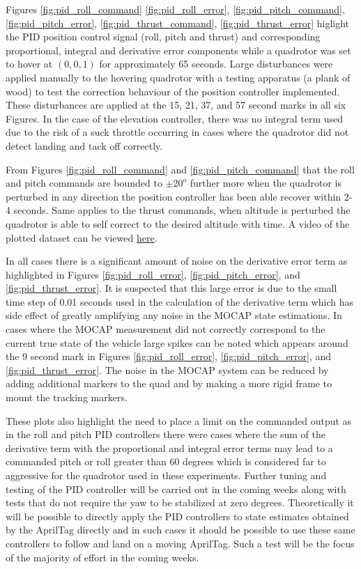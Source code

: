 \documentclass[11pt, twocolumn]{article}
\begin{document}
Figures \ref{fig:pid_roll_command} \ref{fig:pid_roll_error},	\ref{fig:pid_pitch_command}, \ref{fig:pid_pitch_error}, \ref{fig:pid_thrust_command}, \ref{fig:pid_thrust_error} higlight the PID position control signal (roll, pitch and thrust) and corresponding proportional, integral and derivative error components while a quadrotor was set to hover at $(0, 0, 1)$ for approximately 65 seconds. Large disturbances were applied manually to the hovering quadrotor with a testing apparatus (a plank of wood) to test the correction behaviour of the position controller implemented. These disturbances are applied at the 15, 21, 37, and 57 second marks in all six Figures. In the case of the elevation controller, there was no integral term used due to the risk of a suck throttle occurring in cases where the quadrotor did not detect landing and tack off correctly.

From Figures \ref{fig:pid_roll_command} and \ref{fig:pid_pitch_command} that the roll and pitch commands are bounded to $\pm 20^o$ further more when the quadrotor is perturbed in any direction the position controller has been able recover within 2-4 seconds. Same applies to the thrust commands, when altitude is perturbed the quadrotor is able to self correct to the desired altitude with time. A video of the plotted dataset can be viewed \href{https://www.youtube.com/watch?v=v1QDdZ0LdMc&index=17&list=PLk5z6lLnKFd6BD9EXWa09hqf6SNQhn59R}{here}.

In all cases there is a significant amount of noise on the derivative error term as highlighted in Figures \ref{fig:pid_roll_error}, \ref{fig:pid_pitch_error}, and \ref{fig:pid_thrust_error}. It is suspected that this large error is due to the small time step of 0.01 seconds used in the calculation of the derivative term which has side effect of greatly amplifying any noise in the MOCAP state estimations. In cases where the MOCAP measurement did not correctly correspond to the current true state of the vehicle large spikes can be noted which appears around the 9 second mark in Figures \ref{fig:pid_roll_error}, \ref{fig:pid_pitch_error}, and \ref{fig:pid_thrust_error}. The noise in the MOCAP system can be reduced by adding additional markers to the quad and by making a more rigid frame to mount the tracking markers. 

These plots also highlight the need to place a limit on the commanded output as in the roll and pitch PID controllers there were cases where the sum of the derivative term with the proportional and integral error terms may lead to a commanded pitch or roll greater than 60 degrees which is considered far to aggressive for the quadrotor used in these experiments. Further tuning and testing of the PID controller will be carried out in the coming weeks along with tests that do not require the yaw to be stabilized at zero degrees. Theoretically it will be possible to directly apply the PID controllers to state estimates obtained by the AprilTag directly and in such cases it should be possible to use these same controllers to follow and land on a moving AprilTag. Such a test will be the focus of the majority of effort in the coming weeks. 
\end{document}
